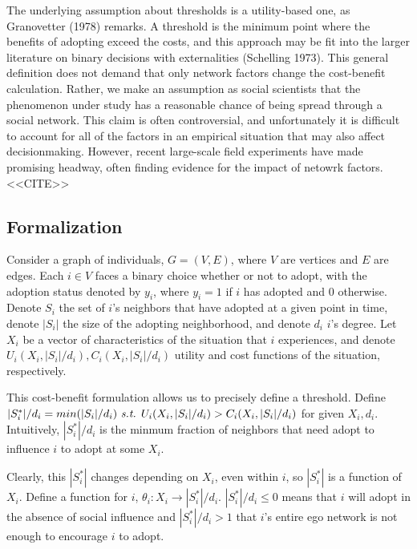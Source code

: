 \documentclass{article}
\begin{document}
The underlying assumption about thresholds is a utility-based one, as Granovetter (1978) remarks. A threshold is the minimum point where the benefits of adopting exceed the costs, and this approach may be fit into the larger literature on binary decisions with externalities (Schelling 1973). This general definition does not demand that only network factors change the cost-benefit calculation. Rather, we make an assumption as social scientists that the phenomenon under study has a reasonable chance of being spread through a social network. This claim is often controversial, and unfortunately it is difficult to account for all of the factors in an empirical situation that may also affect decisionmaking. However, recent large-scale field experiments have made promising headway, often finding evidence for the impact of netowrk factors. <<CITE>>

\subsection{Formalization}

Consider a graph of individuals, $G = (V, E)$, where $V$ are vertices and $E$ are edges. Each $i \in V$ faces a binary choice whether or not to adopt, with the adoption status denoted by $y_i$, where $y_i = 1$ if $i$ has adopted and 0 otherwise. Denote $S_i$ the set of $i$'s neighbors that have adopted at a given point in time, denote $|S_i|$ the size of the adopting neighborhood, and denote $d_i$ $i$'s degree. Let $X_i$ be a vector of characteristics of the situation that $i$ experiences, and denote $U_i(X_i,|S_i|/d_i), C_i(X_i,|S_i|/d_i)$ utility and cost functions of the situation, respectively.

This cost-benefit formulation allows us to precisely define a threshold. Define $|S_i^*|/d_i = min(|S_i|/d_i) \text{ \emph{s.t.} } U_i(X_i,|S_i|/d_i) > C_i(X_i,|S_i|/d_i)$ for given $X_i, d_i$. Intuitively, $|S_i^*|/d_i$ is the minmum fraction of neighbors that need adopt to influence $i$ to adopt at some $X_i$.

Clearly, this $|S_i^*|$ changes depending on $X_i$, even within $i$, so $|S_i^*|$ is a function of $X_i$. Define a function for $i$, $\theta_i: X_i \to |S_i^*|/d_i$. $|S_i^*|/d_i \le 0$ means that $i$ will adopt in the absence of social influence and $|S_i^*|/d_i > 1$ that $i$'s entire ego network is not enough to encourage $i$ to adopt. 
\end{document}
